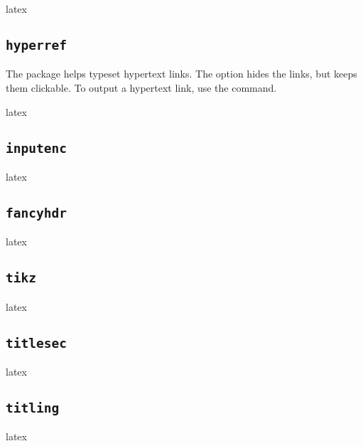 \documentclass{report}
\begin{document}
\begin{imtaCode}{latex}
\RequirePackage[T1]{fontenc}
\end{imtaCode}

\subsection{\texttt{hyperref}}

The  package helps typeset hypertext links.
The  option hides the links, but keeps them clickable.
To output a hypertext link, use the  command.

\begin{imtaCode}{latex}
\RequirePackage[hidelinks]{hyperref}
\end{imtaCode}

\subsection{\texttt{inputenc}}
\begin{imtaCode}{latex}
\RequirePackage[utf8]{inputenc}
\end{imtaCode}

\subsection{\texttt{fancyhdr}}
\begin{imtaCode}{latex}
\RequirePackage{fancyhdr}
\end{imtaCode}

\subsection{\texttt{tikz}}
\begin{imtaCode}{latex}
\RequirePackage{tikz}
\end{imtaCode}

\subsection{\texttt{titlesec}}
\begin{imtaCode}{latex}
\RequirePackage{titlesec}
\end{imtaCode}

\subsection{\texttt{titling}}
\begin{imtaCode}{latex}
\RequirePackage{titling}
\end{imtaCode}
\end{document}
